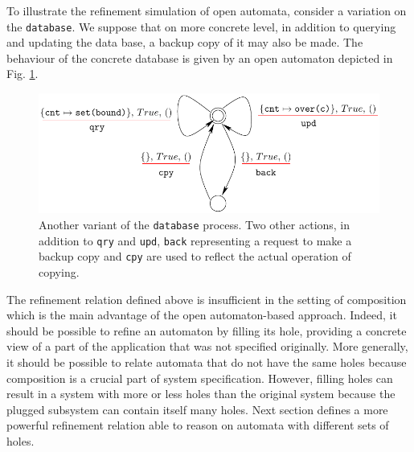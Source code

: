 \documentclass[runningheads]{llncs}
\begin{document}
\begin{example} 
To illustrate the refinement simulation of open automata, consider a variation on the \texttt{database}.  We suppose that on more concrete level, in addition to querying and updating the data base,  a backup copy of it may also be made. The behaviour of the concrete database is given by 
an open automaton  depicted in Fig. \ref{Fig:RefineOA}. 
\end{example}
\begin{figure}[!tb]
 \centering
   \includegraphics[width=.9\textwidth]{Figures/databaseRefine.pdf}
   \caption{Another variant of the \texttt{database} process.  Two other actions,  in addition to  \texttt{qry} and \texttt{upd},  \texttt{back} representing a request to make a backup copy and    \texttt{cpy} are used to reflect the actual operation of copying. \label{Fig:RefineOA}}
\end{figure}



The refinement relation defined above is insufficient in the setting of composition which is the main advantage of the open automaton-based approach. Indeed, it should be possible to refine an automaton by filling its hole, providing a concrete view of a part of the application that was not specified originally. 
More generally, it should be possible to relate automata that do not have the same holes because composition is a crucial part of system specification.
However, filling holes can result in a system with more or less holes than the original system because the plugged subsystem can contain itself many holes.
Next section  defines  a more powerful refinement relation able to reason on automata with different sets of holes.


\end{document}
